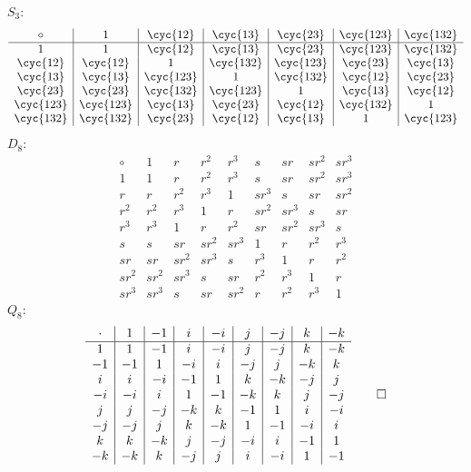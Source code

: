 \begin{sol}
    \leavevmode

    \noindent $S_3$:
    \[
    	\begin{array}{*{6}{c|}c}
            \circ & 1 & \cyc{1 2} & \cyc{1 3} & \cyc{2 3} & \cyc{1 2 3} & \cyc{1 3 2} \\
            \hline
            1 & 1 & \cyc{1 2} & \cyc{1 3} & \cyc{2 3} & \cyc{1 2 3} & \cyc{1 3 2} \\
            \cyc{1 2} & \cyc{1 2} & 1 & \cyc{1 3 2} & \cyc{1 2 3} & \cyc{2 3} & \cyc{1 3} \\
            \cyc{1 3} & \cyc{1 3} & \cyc{1 2 3} & 1 & \cyc{1 3 2} & \cyc{1 2} & \cyc{2 3} \\
            \cyc{2 3} & \cyc{2 3} & \cyc{1 3 2} & \cyc{1 2 3} & 1 & \cyc{1 3} & \cyc{1 2} \\
            \cyc{1 2 3} & \cyc{1 2 3} & \cyc{1 3} & \cyc{2 3} & \cyc{1 2} & \cyc{1 3 2} & 1 \\
            \cyc{1 3 2} & \cyc{1 3 2} & \cyc{2 3} & \cyc{1 2} & \cyc{1 3} & 1 & \cyc{1 2 3}
        \end{array}
	\]
    $D_8$:
    \[
    	\begin{array}{*{8}{c|}c}
            \circ & 1 & r & r^2 & r^3 & s & sr & sr^2 & sr^3 \\
            \hline
            1 & 1 & r & r^2 & r^3 & s & sr & sr^2 & sr^3 \\
            r & r & r^2 & r^3 & 1 & sr^3 & s & sr & sr^2 \\
            r^2 & r^2 & r^3 & 1 & r & sr^2 & sr^3 & s & sr \\
            r^3 & r^3 & 1 & r & r^2 & sr & sr^2 & sr^3 & s \\
            s & s & sr & sr^2 & sr^3 & 1 & r & r^2 & r^3 \\
            sr & sr & sr^2 & sr^3 & s & r^3 & 1 & r & r^2 \\
            sr^2 & sr^2 & sr^3 & s & sr & r^2 & r^3 & 1 & r \\
            sr^3 & sr^3 & s & sr & sr^2 & r & r^2 & r^3 & 1
        \end{array}
	\]
    $Q_8$:
    \[
    	\begin{array}{*{8}{c|}c}
            \cdot & 1 & -1 & i & -i & j & -j & k & -k \\
            \hline
            1 & 1 & -1 & i & -i & j & -j & k & -k \\
            -1 & -1 & 1 & -i & i & -j & j & -k & k \\
            i & i & -i & -1 & 1 & k & -k & -j & j \\
            -i & -i & i & 1 & -1 & -k & k & j & -j \\
            j & j & -j & -k & k & -1 & 1 & i & -i \\
            -j & -j & j & k & -k & 1 & -1 & -i & i \\
            k & k & -k & j & -j & -i & i & -1 & 1 \\
            -k & -k & k & -j & j & i & -i & 1 & -1
        \end{array} \qedhere
	\]
\end{sol}

